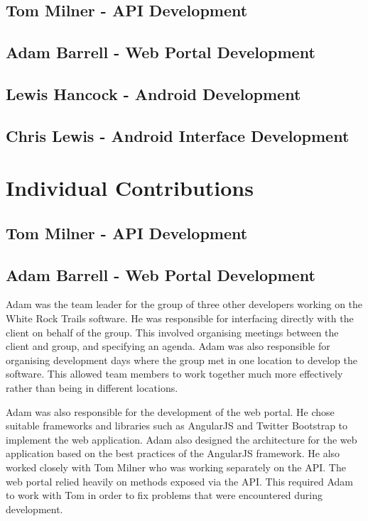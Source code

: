 \documentclass[11pt,a4paper]{report}
\begin{document}
\subsection{Tom Milner - API Development}
\subsection{Adam Barrell - Web Portal Development}
\subsection{Lewis Hancock - Android Development}
\subsection{Chris Lewis - Android Interface Development}

\section{Individual Contributions}
\label{sec:individual-contributions}

\subsection{Tom Milner - API Development}
\subsection{Adam Barrell - Web Portal Development}
Adam was the team leader for the group of three other developers working on the White Rock Trails software. He was responsible for interfacing directly with the client on behalf of the group. This involved organising meetings between the client and group, and specifying an agenda. Adam was also responsible for organising development days where the group met in one location to develop the software. This allowed team members to work together much more effectively rather than being in different locations.

Adam was also responsible for the development of the web portal. He chose suitable frameworks and libraries such as AngularJS and Twitter Bootstrap to implement the web application. Adam also designed the architecture for the web application based on the best practices of the AngularJS framework. He also worked closely with Tom Milner who was  working separately on the API. The web portal relied heavily on methods exposed via the API. This required Adam to work with Tom in order to fix problems that were encountered during development.
\end{document}

